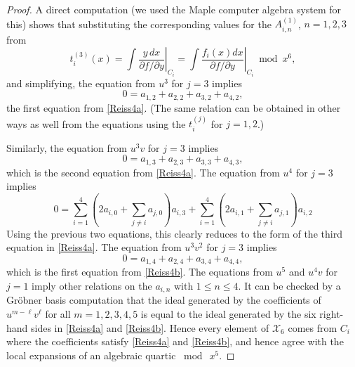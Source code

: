 \documentclass[10pt,a4paper]{amsart}
\begin{document}
\begin{proof}
A direct computation (we used the Maple computer algebra system for this) shows that substituting the corresponding values for the $A_{i,n}^{(1)}$, 
$n = 1, 2,3$ from 
$$t_i^{(3)}(x) =  \int \left. \frac{y\, dx}{\partial f/\partial y}\right|_{C_i} = \int \left. \frac{f_i(x) dx}{\partial f/\partial y}\right|_{C_i} \bmod x^6,$$
and simplifying, the equation from $u^3$ for $j = 3$ implies
$$0 = a_{1,2} + a_{2,2} + a_{3,2} + a_{4,2},$$
the first equation from \eqref{Reiss4a}.  (The same relation can be obtained in other ways as well from the equations using the $t_i^{(j)}$ for $j = 1,2$.)  

Similarly, the equation from $u^3 v$ for $j=3$ implies
$$0 = a_{1,3} + a_{2,3} + a_{3,3} + a_{4,3},$$
which is the second equation from \eqref{Reiss4a}.
The equation from $u^4$ for $j = 3$ implies
$$0 = \sum_{i=1}^4 (2 a_{i,0} + \sum_{j \ne i} a_{j,0}) a_{i,3} + \sum_{i=1}^4 (2 a_{i,1} + \sum_{j \ne i} a_{j,1}) a_{i,2}$$
Using the previous two equations, this clearly reduces to the form of the third equation in \eqref{Reiss4a}.  
The equation from $u^3 v^2$ for $j = 3$ implies
$$0 = a_{1,4} + a_{2,4} + a_{3,4} + a_{4,4},$$
which is the first equation from \eqref{Reiss4b}.   The equations from $u^5$ and $u^4 v$ for $j = 1$ imply other
relations on the $a_{i,n}$ with $1 \le n \le 4$.  It can be checked by a Gr\"obner basis computation that the ideal generated by the coefficients of $u^{m - \ell} v^\ell$
for all $m = 1,2,3,4,5$ is equal to the ideal generated by the six right-hand sides in \eqref{Reiss4a} and \eqref{Reiss4b}.  Hence every element of 
$\mathcal{X}_6$ comes from $C_i$ where the coefficients satisfy \eqref{Reiss4a} and \eqref{Reiss4b}, and hence agree with the local expansions
of an algebraic quartic $\bmod\ x^5$.  
\end{proof}
\end{document}
